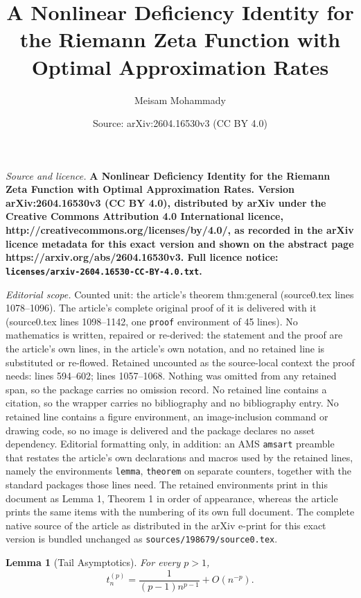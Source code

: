 \documentclass[10pt,a4paper]{amsart}
\title{\bfseries A Nonlinear Deficiency Identity for the Riemann Zeta Function with Optimal Approximation Rates}
\author{Meisam Mohammady}
\date{Source: arXiv:2604.16530v3 (CC BY 4.0)}
\newtheorem{lemma}{Lemma}
\begin{document}
\maketitle

\noindent\emph{Source and licence.} \bfseries A Nonlinear Deficiency Identity for the Riemann Zeta Function with Optimal Approximation Rates. Version arXiv:2604.16530v3 (CC BY 4.0), distributed by arXiv under the Creative Commons Attribution 4.0 International licence, http://creativecommons.org/licenses/by/4.0/, as recorded in the arXiv licence metadata for this exact version and shown on the abstract page https://arxiv.org/abs/2604.16530v3. Full licence notice: \texttt{licenses/arxiv-2604.16530-CC-BY-4.0.txt}.\par\smallskip

\noindent\textit{Editorial scope.} Counted unit: the article's theorem thm:general (source0.tex lines 1078--1096). The article's complete original proof of it is delivered with it (source0.tex lines 1098--1142, one \texttt{proof} environment of 45 lines). No mathematics is written, repaired or re-derived: the statement and the proof are the article's own lines, in the article's own notation, and no retained line is substituted or re-flowed.  Retained uncounted as the source-local context the proof needs: lines 594--602; lines 1057--1068.  Nothing was omitted from any retained span, so the package carries no omission record.  No retained line contains a citation, so the wrapper carries no bibliography and no bibliography entry.  No retained line contains a figure environment, an image-inclusion command or drawing code, so no image is delivered and the package declares no asset dependency.  Editorial formatting only, in addition: an AMS \texttt{amsart} preamble that restates the article's own declarations and macros used by the retained lines, namely the environments \texttt{lemma}, \texttt{theorem} on separate counters, together with the standard packages those lines need.  The retained environments print in this document as Lemma 1, Theorem 1 in order of appearance, whereas the article prints the same items with the numbering of its own full document.  The complete native source of the article as distributed in the arXiv e-print for this exact version is bundled unchanged as \texttt{sources/198679/source0.tex}.
\begin{lemma}[Tail Asymptotics]
\label{lem:tail}
For every \(p>1\),
\[
t_n^{(p)}
=
\frac{1}{(p-1)n^{p-1}}+O(n^{-p}).
\]
\end{lemma}
\end{document}
